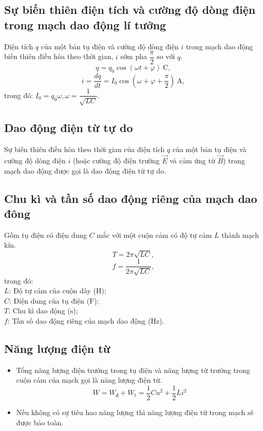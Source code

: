 \subsection{Sự biến thiên điện tích và cường độ dòng điện trong mạch dao động lí tưởng}
Điện tích $q$ của một bản tụ điện và cường độ dòng điện $i$ trong mạch dao động biến thiên điều hòa theo thời gian, $i$ sớm pha $\dfrac{\pi}{2} $ so với $q$.
\begin{equation}
	q=q_0\cos(\omega t +\varphi)\ \text{C}, 
\end{equation}
\begin{equation}
	i=\frac{dq}{dt}=I_0 \cos(\omega +\varphi+ \frac{\pi}{2})\ \text{A},
\end{equation}
trong đó: $I_0=q_0\omega, \omega =\dfrac{1}{\sqrt {LC}}$.
\subsection {Dao động điện từ tự do}
Sự biến thiên điều hòa theo thời gian của điện tích $q$ của một bản tụ điện và cường độ dòng điện $i$ (hoặc cường độ điện trường $\vec{E}$ và cảm ứng từ $\vec{B}$) trong mạch dao động được gọi là dao động điện từ tự do.
\subsection {Chu kì và tần số dao động riêng của mạch dao đông}
Gồm tụ điện có điện dung $C$ mắc với một cuộn cảm có độ tự cảm $L$ thành mạch kín.
\begin{equation}
	T=2\pi \sqrt {LC},
\end{equation}
\begin{equation}
	f=\frac{1}{2\pi\sqrt {LC}},
\end{equation}
trong đó:\\
$L$: Độ tự cảm của cuộn dây ($\text{H}$);\\
$C$: Điện dung của tụ điện ($\text{F}$);\\
$T$: Chu kì dao động ($\text{s}$);\\
$f$: Tần số dao động riêng của mạch dao động ($\text{Hz}$).
\subsection {Năng lượng điện từ}
\begin{itemize}
	\item Tổng năng lượng điện trường trong tụ điện và năng lượng từ trường trong cuộn cảm của mạch gọi là năng lượng điện từ.\\
	\begin{equation}
		W=W_{\text{đ}}+W_{t}=\frac{1}{2}Cu^2+\frac{1}{2}Li^2
	\end{equation}
	\item Nếu không có sự tiêu hao năng lượng thì năng lượng điện từ trong mạch sẽ được bảo toàn.
\end{itemize}
